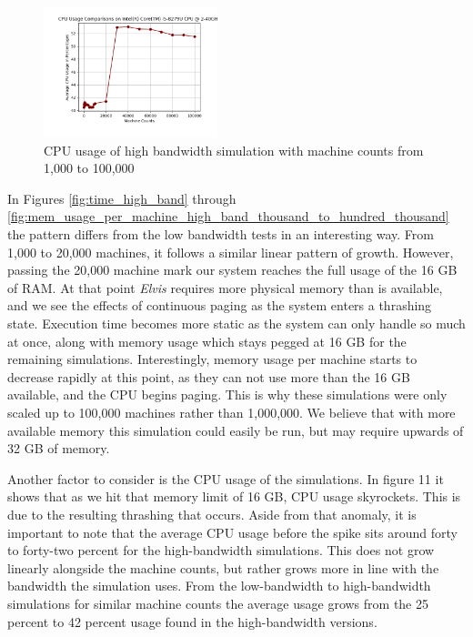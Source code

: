 \documentclass[journal]{IEEEtran} %
\newcommand{\imagewidth}{0.45\textwidth}
\newcommand{\elvis}{\textit{Elvis}}
\begin{document}
\begin{figure}[H]
    \centerline{\includegraphics[width=\imagewidth]{Images/CPU_usage_high_band.png}}
    \caption{CPU usage of high bandwidth simulation with machine counts from 1,000 to 100,000}
    \label{fig:CPU_usage_high_band}
\end{figure}
In Figures \ref{fig:time_high_band} through \ref{fig:mem_usage_per_machine_high_band_thousand_to_hundred_thousand} the pattern differs from the low bandwidth tests in an interesting way. From 1,000 to 20,000 machines, it follows a similar linear pattern of growth. However, passing the 20,000 machine mark our system reaches the full usage of the 16 GB of RAM. At that point \elvis{} requires more physical memory than is available, and we see the effects of continuous paging as the system enters a thrashing state. Execution time becomes more static as the system can only handle so much at once, along with memory usage which stays pegged at 16 GB for the remaining simulations. Interestingly, memory usage per machine starts to decrease rapidly at this point, as they can not use more than the 16 GB available, and the CPU begins paging. This is why these simulations were only scaled up to 100,000 machines rather than 1,000,000. We believe that with more available memory this simulation could easily be run, but may require upwards of 32 GB of memory.

Another factor to consider is the CPU usage of the simulations. In figure 11 it shows that as we hit that memory limit of 16 GB, CPU usage skyrockets. This is due to the resulting thrashing that occurs. Aside from that anomaly, it is important to note that the average CPU usage before the spike sits around forty to forty-two percent for the high-bandwidth simulations. This does not grow linearly alongside the machine counts, but rather grows more in line with the bandwidth the simulation uses. From the low-bandwidth to high-bandwidth simulations for similar machine counts the average usage grows from the 25 percent to 42 percent usage found in the high-bandwidth versions.
\end{document}
